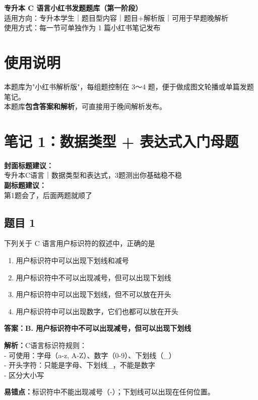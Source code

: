 \documentclass[12pt,a4paper]{ctexart}
\begin{document}
\begin{center}
	{\LARGE \textbf{专升本 C 语言小红书发题题库（第一阶段）}}\\[0.6em]
	{\large 适用方向：专升本学生｜题目型内容｜题目+解析版｜可用于早题晚解析}\\[0.8em]
	{\normalsize 使用方式：每一节可单独作为 1 篇小红书笔记发布}
\end{center}

\vspace{1em}

\section*{使用说明}
本题库为"小红书解析版"，每组题控制在 3～4 题，便于做成图文轮播或单篇发题笔记。\\
本题库\textbf{包含答案和解析}，可直接用于晚间解析发布。

\newpage

\section{笔记 1：数据类型 + 表达式入门母题}
\begin{coverbox}
	\textbf{封面标题建议：}\\
	专升本C语言｜数据类型和表达式，3题测出你基础稳不稳\\
	\textbf{副标题建议：}\\
	第1题会了，后面两题就顺了
\end{coverbox}

\subsection*{题目 1}
下列关于 C 语言用户标识符的叙述中，正确的是
\begin{enumerate}[label=\Alph*.]
	\item 用户标识符中可以出现下划线和减号
	\item 用户标识符中不可以出现减号，但可以出现下划线
	\item 用户标识符中可以出现下划线，但不可以放在开头
	\item 用户标识符中可以出现数字，它们也都可以放在开头
\end{enumerate}

\begin{answerbox}
	\textbf{答案：B. 用户标识符中不可以出现减号，但可以出现下划线}

	\textbf{解析：}C语言标识符规则：\\
	- 可使用：字母（a-z, A-Z）、数字（0-9）、下划线（\_）\\
	- 开头字符：只能是字母、下划线\_，不能是数字\\
	- 区分大小写

	\textbf{易错点：}标识符中不能出现减号（-）；下划线可以出现在任何位置。
\end{answerbox}
\end{document}
